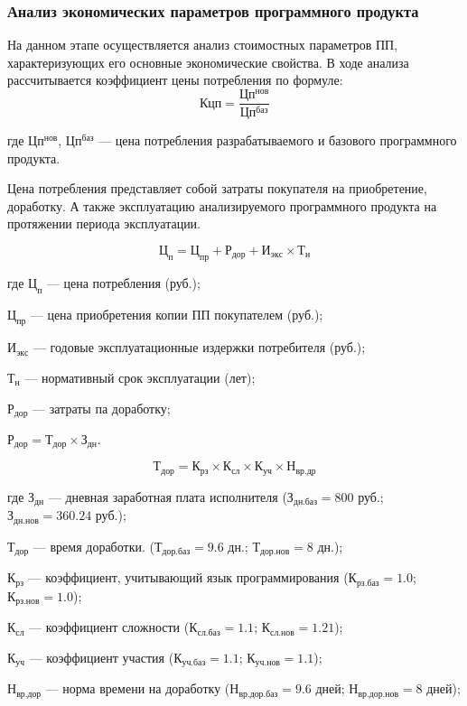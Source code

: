 \subsubsection{Анализ экономических параметров программного продукта}
На данном этапе осуществляется анализ стоимостных параметров ПП, характеризующих его основные экономические свойства.
В ходе анализа рассчитывается коэффициент цены потребления по  формуле:
\begin{equation}Кцп = \frac{Цп^{нов}}{Цп^{баз}}\end{equation}

\begin{ESKDexplanation}
	\item[где ] $Цп^{нов}$, $Цп^{баз}$ --- цена потребления разрабатываемого и базового программного продукта.
\end{ESKDexplanation}

Цена потребления представляет собой затраты покупателя на приобретение, доработку.
А также эксплуатацию анализируемого программного продукта на протяжении периода эксплуатации.

\begin{equation}
	Ц_{п} = Ц_{пр} + Р_{дор} + И_{экс} \times{} Т_{н}
\end{equation}

\begin{ESKDexplanation}
	\item[где ]{} $Ц_{п}$ --- цена потребления (руб.);
	\item{} $Ц_{пр}$ --- цена приобретения копии ПП покупателем (руб.);
	\item{} $И_{экс}$ --- годовые эксплуатационные издержки потребителя (руб.);
	\item{} $Т_{н}$ --- нормативный срок эксплуатации (лет);
	\item{} $Р_{дор}$ --- затраты па доработку;
\end{ESKDexplanation}
$Р_{дор} = Т_{дор} \times З_{дн}$.

\begin{equation}
	Т_{дор} = К_{рз} \times{} К_{сл} \times{} К_{уч} \times{} Н_{вр.др}
\end{equation}

\begin{ESKDexplanation}
	\item[где ]{} $З_{дн}$ --- дневная заработная плата исполнителя ($З_{дн.баз} = 800$ руб.; $З_{дн.нов} = 360.24$ руб.);
	\item{} $Т_{дор}$ --- время доработки. ($Т_{дор.баз} = 9.6$ дн.;   $Т_{дор.нов} = 8$ дн.);
	\item{} $К_{рз}$ --- коэффициент, учитывающий язык программирования ($К_{рз.баз} = 1.0$;  $К_{рз.нов} = 1.0$);
	\item{} $К_{сл}$ --- коэффициент сложности ($К_{сл.баз} = 1.1$; $К_{сл.нов} = 1.21$);
	\item{} $К_{уч}$ --- коэффициент участия ($К_{уч.баз} =1.1$; $К_{уч.нов} = 1.1$);
	\item{} $Н_{вр.дор}$ --- норма времени на доработку ($Н_{вр.дор.баз} = 9.6$ дней; $Н_{вр.дор.нов} = 8$ дней);
\end{ESKDexplanation}

